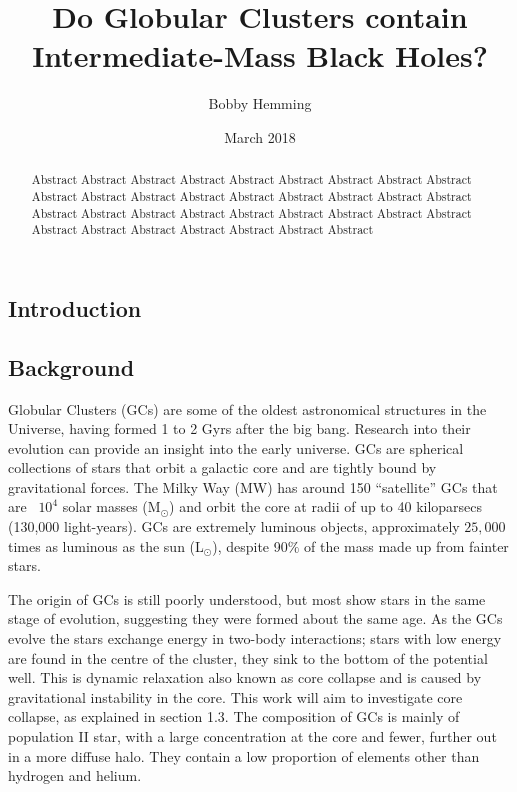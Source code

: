 \documentclass{article}
\title{Do Globular Clusters contain Intermediate-Mass Black Holes?}
\author{Bobby Hemming}
\date{March 2018}
\begin{document}
\maketitle
\begin{abstract}
Abstract Abstract Abstract Abstract Abstract Abstract Abstract Abstract Abstract Abstract Abstract Abstract Abstract Abstract Abstract Abstract Abstract Abstract Abstract Abstract Abstract Abstract Abstract Abstract Abstract Abstract Abstract Abstract Abstract Abstract Abstract Abstract Abstract Abstract 
\end{abstract}
\begin{multicols}{2}



\section{Introduction}

\subsection{Background}
Globular Clusters (GCs) are some of the oldest astronomical structures in the Universe, having formed 1 to 2 Gyrs after the big bang. Research into their evolution can provide an insight into  the early universe. GCs are spherical collections of stars that orbit a galactic core and are tightly bound by gravitational forces. The Milky Way (MW) has around 150 “satellite” GCs that are ~$10^4$ solar masses (M$_{\odot}$) and orbit the core at radii of up to 40 kiloparsecs (130,000 light-years). GCs are extremely luminous objects, approximately $25,000$ times as luminous as the sun (L$_{\odot}$), despite 90$\%$ of the mass made up from fainter stars. 

The origin of GCs is still poorly understood, but most show stars in the same stage of evolution, suggesting they were formed about the same age. As the GCs evolve the stars exchange energy in two-body interactions; stars with low energy are found in the centre of the cluster, they sink to the bottom of the potential well. This is dynamic relaxation also known as core collapse and is caused by gravitational instability in the core. This work will aim to investigate core collapse, as explained in section 1.3. The composition of GCs is mainly of population II star, with a large concentration at the core and fewer, further out in a more diffuse halo. They contain a low proportion of elements other than hydrogen and helium.


\end{multicols}
\end{document}
